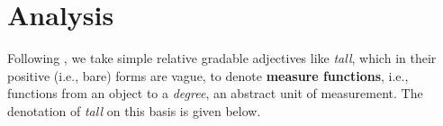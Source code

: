 \documentclass[output=paper,
modfonts
]{langscibook}
\begin{document}
%
%
%
%
%
%
%

\section{Analysis}\label{sec:bochnakklecha:5}

Following \citet{kennedy97projecting, kennedy07vagueness}, we take simple relative gradable adjectives like \textit{tall}, which in their positive (i.e., bare) forms are vague, to denote \textbf{measure functions}, i.e., functions from an object to a \textit{degree}, an abstract unit of measurement.
The denotation of \textit{tall} on this basis is given below.
\end{document}
